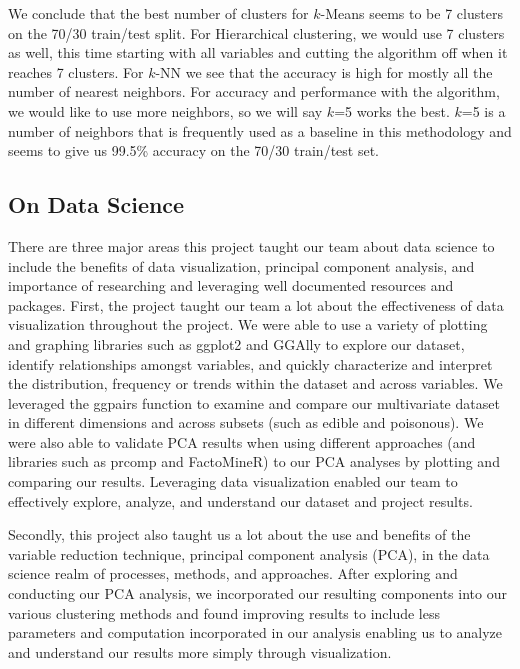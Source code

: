 \documentclass{article}
\begin{document}
We conclude that the best number of clusters for $k$-Means seems to be 7 clusters on the 70/30 train/test split. For Hierarchical clustering, we would use 7 clusters as well, this time starting with all variables and cutting the algorithm off when it reaches 7 clusters. For $k$-NN we see that the accuracy is high for mostly all the number of nearest neighbors. For accuracy and performance with the algorithm, we would like to use more neighbors, so we will say $k$=5 works the best. $k$=5 is a number of neighbors that is frequently used as a baseline in this methodology and seems to give us 99.5\% accuracy on the 70/30 train/test set.

\subsection{On Data Science}
There are three major areas this project taught our team about data science to include the benefits of data visualization, principal component analysis, and importance of researching and leveraging well documented resources and packages.  First, the project taught our team a lot about the effectiveness of data visualization throughout the project.  We were able to use a variety of plotting and graphing libraries such as ggplot2 and GGAlly to explore our dataset, identify relationships amongst variables, and quickly characterize and interpret the distribution, frequency or trends within the dataset and across variables.  We leveraged the ggpairs function to examine and compare our multivariate dataset in different dimensions and across subsets (such as edible and poisonous).  We were also able to validate PCA results when using different approaches (and libraries such as prcomp and FactoMineR) to our PCA analyses by plotting and comparing our results.   Leveraging data visualization enabled our team to effectively explore, analyze, and understand our dataset and project results.  

Secondly, this project also taught us a lot about the use and benefits of the variable reduction technique, principal component analysis (PCA), in the data science realm of processes, methods, and approaches.  After exploring and conducting our PCA analysis, we incorporated our resulting components into our various clustering methods and found improving results to include less parameters and computation incorporated in our analysis enabling us to analyze and understand our results more simply through visualization.   
\end{document}

